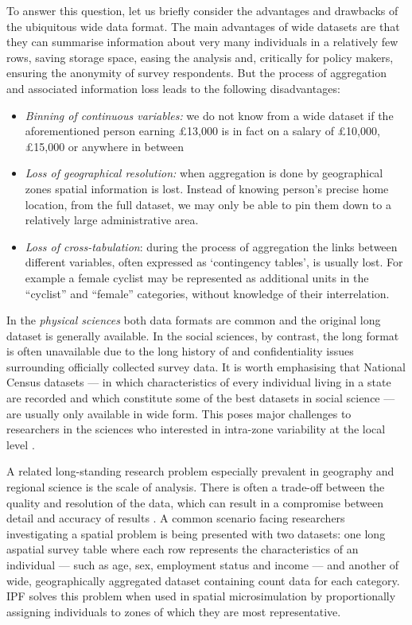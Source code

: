 \documentclass[a4paper,10pt]{article}
\begin{document}
To answer this question, let us briefly consider the advantages and drawbacks of the ubiquitous wide
data format. The main advantages of wide datasets are that they can summarise information about very many individuals
in a relatively few rows, saving storage space, easing the analysis and, critically for policy makers,
ensuring the anonymity of
survey respondents. But the process of aggregation
and associated information loss
leads to the following disadvantages:
\begin{itemize}
 \item \emph{Binning of continuous variables:} we do
not know from a wide dataset if the aforementioned person earning \pounds13,000 is in fact on a salary of
\pounds10,000, \pounds15,000 or 
anywhere in between
 \item \emph{Loss of geographical resolution:} when aggregation is done by geographical zones
 spatial information is lost. Instead of knowing person's precise home location, from the full dataset, we
may only be able to pin them down to a relatively large administrative area.
 \item \emph{Loss of cross-tabulation}: during the process of
aggregation the links between different variables, often expressed as `contingency tables',
is usually lost. For example a female cyclist may be represented as additional units in the
``cyclist'' and ``female'' categories, without knowledge of their interrelation.
\end{itemize}

In the \emph{physical sciences} both data formats are common and the
original long dataset is generally available. In the social sciences, by contrast, the long format is often unavailable
due to the long history of and confidentiality 
issues surrounding officially collected survey data.
It is worth emphasising that National Census datasets --- in which characteristics of 
every individual living in a state are recorded and which constitute some of the best datasets in social science ---
are usually only available
in wide form. This poses major challenges to researchers in the sciences who
interested in intra-zone variability at the local level \citep{Whitworth2012,Lee2009}.

A related long-standing research problem especially prevalent in geography and regional science
is the scale of analysis. There is often a trade-off between the quality and resolution 
of the data, which can result in a compromise between detail and accuracy of results 
\citep{ballas2003microsimulation-30-years}. A common scenario facing researchers investigating 
a spatial problem is being presented with two datasets: one long aspatial 
survey table where each row represents the characteristics of an individual --- such as
age, sex, employment status and income --- and another of wide, geographically aggregated 
dataset containing count data for each category. IPF solves this problem when used in
spatial microsimulation by proportionally assigning individuals to zones of which they
are most representative.
\end{document}

